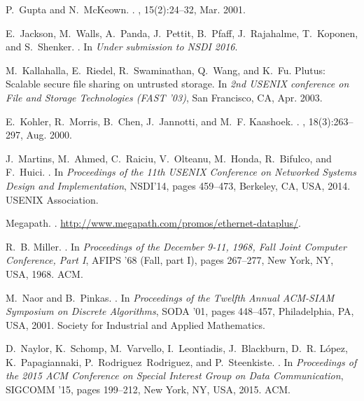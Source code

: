 \documentclass[letterpaper,twocolumn,10pt]{article}
\begin{document}
{\begin{thebibliography}{10}
P.~Gupta and N.~McKeown.
.
, 15(2):24--32, Mar. 2001.

E.~Jackson, M.~Walls, A.~Panda, J.~Pettit, B.~Pfaff, J.~Rajahalme, T.~Koponen,
  and S.~Shenker.
.
\newblock In {\em Under submission to NSDI 2016}.

M.~Kallahalla, E.~Riedel, R.~Swaminathan, Q.~Wang, and K.~Fu.
\newblock Plutus: Scalable secure file sharing on untrusted storage.
\newblock In {\em 2nd {USENIX} conference on File and Storage Technologies
  ({FAST} '03)}, San Francisco, CA, Apr. 2003.

E.~Kohler, R.~Morris, B.~Chen, J.~Jannotti, and M.~F. Kaashoek.
.
, 18(3):263--297, Aug. 2000.

J.~Martins, M.~Ahmed, C.~Raiciu, V.~Olteanu, M.~Honda, R.~Bifulco, and
  F.~Huici.
.
\newblock In {\em Proceedings of the 11th {USENIX} Conference on Networked
  Systems Design and Implementation}, {NSDI}'14, pages 459--473, Berkeley,
  {CA}, {USA}, 2014. {USENIX} Association.

{Megapath}.
.
\newblock \url{http://www.megapath.com/promos/ethernet-dataplus/}.

R.~B. Miller.
.
\newblock In {\em Proceedings of the December 9-11, 1968, Fall Joint Computer
  Conference, Part I}, AFIPS '68 (Fall, part I), pages 267--277, New York, NY,
  USA, 1968. ACM.

M.~Naor and B.~Pinkas.
.
\newblock In {\em Proceedings of the Twelfth Annual {ACM}-{SIAM} Symposium on
  Discrete Algorithms}, {SODA} '01, pages 448--457, Philadelphia, {PA}, {USA},
  2001. Society for Industrial and Applied Mathematics.

D.~Naylor, K.~Schomp, M.~Varvello, I.~Leontiadis, J.~Blackburn, D.~R.
  L\'{o}pez, K.~Papagiannaki, P.~Rodriguez~Rodriguez, and P.~Steenkiste.
.
\newblock In {\em Proceedings of the 2015 ACM Conference on Special Interest
  Group on Data Communication}, SIGCOMM '15, pages 199--212, New York, NY, USA,
  2015. ACM.


\end{thebibliography}}
\end{document}
